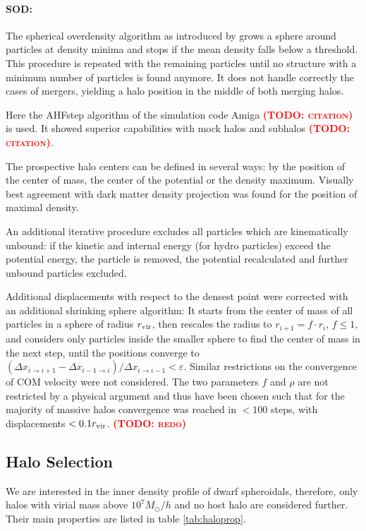 \documentclass[useAMS,usenatbib]{mn2e}
\newcommand{\TODO}[1]{\textsc{\textbf{\textcolor{red}{(TODO: #1)}}}}
\begin{document}
\paragraph{SOD:}
The spherical overdensity algorithm as introduced by \cite{Lacey1994}
grows a sphere around particles at density minima and stops if the
mean density falls below a threshold. This procedure is repeated with
the remaining particles until no structure with a minimum number of
particles is found anymore. It does not handle correctly the cases of
mergers, yielding a halo position in the middle of both merging halos.

Here the {\sc AHFstep} algorithm of the simulation code {\sc Amiga}
\TODO{citation} is used. It showed superior capabilities with mock
halos and subhalos \TODO{citation}. 


The prospective halo centers can be defined in several ways: by the
position of the center of mass, the center of the potential or the
density maximum. Visually best agreement with dark matter density
projection was found for the position of maximal density.

An additional iterative procedure excludes all particles which are
kinematically unbound: if the kinetic and internal energy (for hydro
particles) exceed the potential energy, the particle is removed, the
potential recalculated and further unbound particles excluded.

Additional displacements with respect to the densest point were
corrected with an additional shrinking sphere algorithm: It starts
from the center of mass of all particles in a sphere of radius $r_{\rm
  vir}$, then rescales the radius to $r_{i+1}=f\cdot r_i$, $f\leq
1$, and considers only particles inside the smaller sphere to find the
center of mass in the next step, until the positions converge to
$(\Delta x_{i\to i+1}-\Delta x_{i-1\to i})/\Delta x_{i\to
  i-1}<\varepsilon$. Similar restrictions on the convergence of COM
velocity were not considered. The two parameters $f$ and $\rho$ are
not restricted by a physical argument and thus have been chosen such
that for the majority of massive halos convergence was reached in
$<100$ steps, with displacements $<0.1r_{\rm vir}$. \TODO{redo}

\subsection{Halo Selection}
We are interested in the inner density profile of dwarf spheroidals,
therefore, only halos with virial mass above $10^7M_\odot/h$ and no
host halo are considered further. Their main properties are listed in
table \ref{tab:haloprop}.
\end{document}

